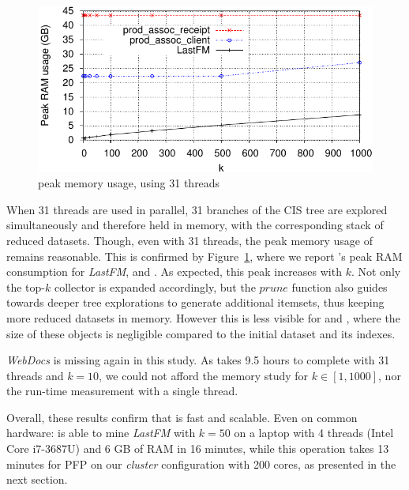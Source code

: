 \begin{figure}
	\centering
	\includegraphics{fig/toppi/ram/RAM-all.pdf}
	\caption{\label{fig:ram}
		\toppi peak memory usage, using 31 threads
	}
\end{figure}

\begin{paragraph}{}
When 31 threads are used in parallel,
31 branches of the CIS tree are explored simultaneously and therefore held in memory,
with the corresponding stack of reduced datasets.
Though, even with 31 threads, the peak memory usage of \toppi remains reasonable.
This is confirmed by Figure~\ref{fig:ram},
where we report \toppi's peak RAM consumption  for \emph{LastFM}, \prodassocreceipt and \prodassocclient.
As expected, this peak increases with $k$.
Not only the top-$k$ collector is expanded accordingly,
but the $\mathit{prune}$ function also guides \toppi towards deeper tree explorations to generate additional itemsets,
thus keeping more reduced datasets in memory.
However this is less visible for \prodassocreceipt and \prodassocclient,
where the size of these objects is negligible compared to the initial dataset and its indexes.
\end{paragraph}

\begin{paragraph}{}
{\em WebDocs} is missing again in this study.
As \toppi takes 9.5 hours to complete with 31 threads and $k=10$,
we could not afford the memory study for $k \in [1, 1000]$,
nor the run-time measurement with a single thread.

Overall, these results confirm that \toppi is fast and scalable.
Even on common hardware:
\toppi is able to mine \textit{LastFM} with $k=50$ on a
laptop with 4 threads (Intel Core i7-3687U) and 6 GB of RAM in 16 minutes,
while this operation takes 13 minutes for PFP on our \textit{cluster} configuration with 200 cores,
as presented in the next section.
\end{paragraph}





